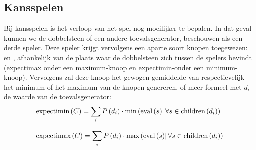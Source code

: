 \subsection{Kansspelen}
Bij kansspelen is het verloop van het spel nog moeilijker te bepalen. In dat geval kunnen we de dobbelsteen of een andere toevalsgenerator, beschouwen als een derde speler. Deze speler krijgt vervolgens een aparte soort knopen toegewezen:  en , afhankelijk van de plaats waar de dobbelsteen zich tussen de spelers bevindt (expectimax onder een maximum-knoop en expectimin-onder een minimum-knoop). Vervolgens zal deze knoop het gewogen gemiddelde van respectievelijk het minimum of het maximum van de knopen genereren, of meer formeel met $d_i$ de waarde van de toevalsgenerator:
\begin{equation}
\begin{array}{l}
\mbox{expectimin}\left( C \right)=\displaystyle\sum_{i}{P\left(d_i\right)\cdot\mbox{min}\left(\mbox{eval}\left( s \right)\right|\forall s\in\mbox{children}\left( d_i \right))}\\\\
\mbox{expectimax}\left( C \right)=\displaystyle\sum_{i}{P\left(d_i\right)\cdot\mbox{max}\left(\mbox{eval}\left( s \right)\right|\forall s\in\mbox{children}\left( d_i \right))}
\end{array}
\end{equation}
